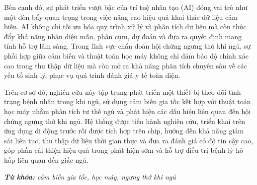 Bên cạnh đó, sự phát triển vượt bậc của trí tuệ nhân tạo (AI) đóng vai trò như một đòn bẩy quan trọng trong việc nâng cao hiệu quả khai thác dữ liệu cảm biến. AI không chỉ tối ưu hóa quy trình xử lý và phân tích dữ liệu mà còn thúc đẩy khả năng nhận diện mẫu, phân cụm, dự đoán và đưa ra quyết định mang tính hỗ trợ lâm sàng. Trong lĩnh vực chẩn đoán hội chứng ngưng thở khi ngủ, sự phối hợp giữa cảm biến và thuật toán học máy không chỉ đảm bảo độ chính xác cao trong thu thập dữ liệu mà còn mở ra khả năng phân tích chuyên sâu về các yếu tố sinh lý, phục vụ quá trình đánh giá y tế toàn diện.

Trên cơ sở đó, nghiên cứu này tập trung phát triển một thiết bị theo dõi tình trạng bệnh nhân trong khi ngủ, sử dụng cảm biến gia tốc kết hợp với thuật toán học máy nhằm phân tích tư thế ngủ và phát hiện các dấu hiệu liên quan đến hội chứng ngưng thở khi ngủ. Hệ thống được tiến hành nghiên cứu, triển khai trên ứng dụng di động trước rồi được tích hợp trên chip, hướng đến khả năng giám sát liên tục, thu thập dữ liệu thời gian thực và đưa ra đánh giá có độ tin cậy cao, góp phần cải thiện hiệu quả trong phát hiện sớm và hỗ trợ điều trị bệnh lý hô hấp liên quan đến giấc ngủ.


\vspace{-0.5cm}
\begin{flushleft}
  \textit{\textbf{Từ khóa: } cảm biến gia tốc, học máy, ngưng thở khi ngủ}
\end{flushleft}



\changefontsizes[16pt]{13pt}
